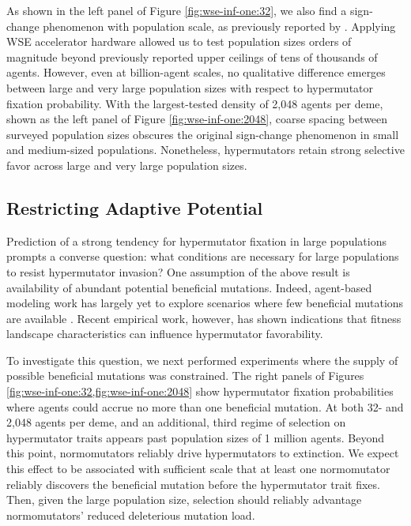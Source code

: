 As shown in the left panel of Figure \ref{fig:wse-inf-one:32}, we also find a sign-change phenomenon with population scale, as previously reported by \citet{raynes2018sign}.
Applying WSE accelerator hardware allowed us to test population sizes orders of magnitude beyond previously reported upper ceilings of tens of thousands of agents.
However, even at billion-agent scales, no qualitative difference emerges between large and very large population sizes with respect to hypermutator fixation probability.
With the largest-tested density of 2,048 agents per deme, shown as the left panel of Figure \ref{fig:wse-inf-one:2048}, coarse spacing between surveyed population sizes obscures the original sign-change phenomenon in small and medium-sized populations.
Nonetheless, hypermutators retain strong selective favor across large and very large population sizes.

\subsection{Restricting Adaptive Potential}
\label{sec:restricting-adaptive-potential}

Prediction of a strong tendency for hypermutator fixation in large populations prompts a converse question: what conditions are necessary for large populations to resist hypermutator invasion?
One assumption of the above result is availability of abundant potential beneficial mutations.
Indeed, agent-based modeling work has largely yet to explore scenarios where few beneficial mutations are available \citep{raynes2013effect,raynes2018sign,raynes2019selection,raynes2019migration}.
Recent empirical work, however, has shown indications that fitness landscape characteristics can influence hypermutator favorability.

To investigate this question, we next performed experiments where the supply of possible beneficial mutations was constrained.
The right panels of Figures \cref{fig:wse-inf-one:32,fig:wse-inf-one:2048} show hypermutator fixation probabilities where agents could accrue no more than one beneficial mutation.
At both 32- and 2,048 agents per deme, and an additional, third regime of selection on hypermutator traits appears past population sizes of 1 million agents.
Beyond this point, normomutators reliably drive hypermutators to extinction.
We expect this effect to be associated with sufficient scale that at least one normomutator reliably discovers the beneficial mutation before the hypermutator trait fixes.
Then, given the large population size, selection should reliably advantage normomutators' reduced deleterious mutation load.

